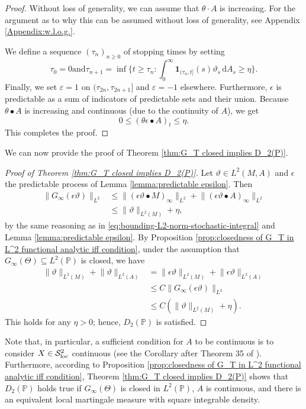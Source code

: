 \documentclass[11pt,a4paper,twoside,openany]{report}
\numberwithin{equation}{section}
\newcommand{\diff}{\mathrm{d}}
\theoremstyle{plain} %
\theoremstyle{definition} %
\theoremstyle{remark} %
\let\parencite\authnumparencite
\begin{document}
\begin{proof}
Without loss of generality, we can assume that $\theta\cdot A$ is increasing. For the argument as to why this can be assumed without loss of generality, see Appendix \ref{Appendix:w.l.o.g.}.


We define a sequence $(\tau_n)_{n\ge 0}$ of stopping times by setting
\[
\tau_0=0
\text{and}
\tau_{n+1}=\inf\{t\ge \tau_n : \int_0^{\infty} \mathbf{1}_{(\tau_n,t]}(s)\vartheta_s\,\diff A_s \ge \eta\}.
\]
Finally, we set $\varepsilon=1$ on $(\tau_{2n},\tau_{2n+1}]$ and $\varepsilon=-1$ elsewhere. Furthermore, \(\epsilon\) is predictable as a sum of indicators of predictable sets and their union. Because \(\theta\bullet A\) is increasing and continuous (due to the continuity of \(A\)), we get 
\begin{equation*}
    0\leq (\theta\epsilon\bullet A)_t\leq \eta.
\end{equation*}
This completes the proof.
\end{proof}
We can now provide the proof of Theorem \ref{thm:G_T closed implies D_2(P)}.
\begin{proof}[Proof of Theorem \ref{thm:G_T closed implies D_2(P)}]
    Let \(\vartheta\in L^2(M,A)\) and \(\epsilon\) the predictable process of Lemma \ref{lemma:predictable epsilon}. Then 
    \begin{align*}
        \lVert G_{\infty}(\epsilon\vartheta)\rVert_{L^2}&\leq \lVert (\epsilon\vartheta\bullet M)_{\infty}\rVert_{L^2}+\lVert (\epsilon\vartheta\bullet A)_{\infty}\rVert_{L^2}
        \\
        &\leq \lVert \vartheta\rVert_{L^2(M)}+\eta,
    \end{align*}
    by the same reasoning as in \eqref{eq:bounding-L2-norm-stochastic-integral} and Lemma \ref{lemma:predictable epsilon}. By Proposition \ref{prop:closedness of G_T in L^2 functional analytic iff condition}, under the assumption that \(G_{\infty}(\Theta)\subseteq L^2(\mathbb{P})\) is closed, we have
    \begin{align*}
        \lVert \vartheta\rVert_{L^2(M)}+\lVert \vartheta\rVert_{L^2(A)}&=\lVert \epsilon\vartheta\rVert_{L^2(M)}+\lVert \epsilon\vartheta\rVert_{L^2(A)}\\&
        \leq C\lVert{G_{\infty}(\epsilon\vartheta)}\rVert_{L^2}
        \\&\leq C(\lVert\vartheta\rVert_{L^2(M)}+\eta).
    \end{align*}
    This holds for any \(\eta>0\); hence, \(D_2(\mathbb{P})\) is satisfied.
\end{proof}
Note that, in particular, a sufficient condition for \(A\) to be continuous is to consider \(X\in\mathcal{S}_{\rm{loc}}^2\) continuous (see the Corollary after Theorem 35 of \parencite{Protter2005StochasticIntegration}). Furthermore, according to Proposition \ref{prop:closedness of G_T in L^2 functional analytic iff condition}, Theorem  \ref{thm:G_T closed implies D_2(P)} shows that \(D_2(\mathbb{P})\) holds true if \(G_{\infty}(\Theta)\) is closed in \(L^2(\mathbb{P})\), \(A\) is continuous, and there is an equivalent local martingale measure with square integrable density.
\end{document}
